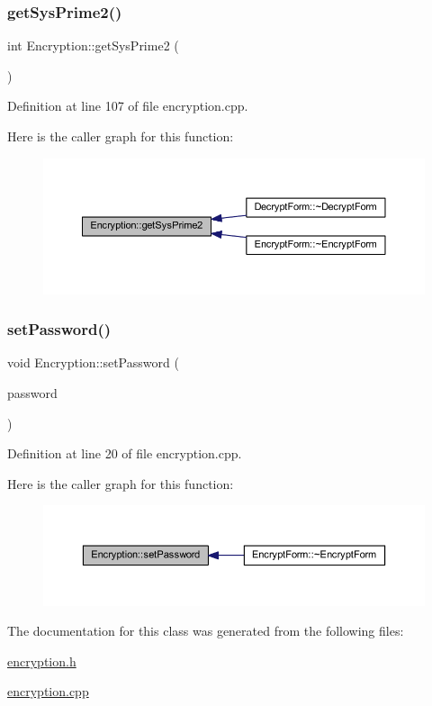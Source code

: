 \subsubsection{\texorpdfstring{get\+Sys\+Prime2()}{getSysPrime2()}}
{\footnotesize\ttfamily int Encryption\+::get\+Sys\+Prime2 (\begin{DoxyParamCaption}{ }\end{DoxyParamCaption})}



Definition at line 107 of file encryption.\+cpp.

Here is the caller graph for this function\+:\nopagebreak
\begin{figure}[H]
\begin{center}
\leavevmode
\includegraphics[width=350pt]{class_encryption_a4a18c3b332487ec393c3ddf06c39c48f_icgraph}
\end{center}
\end{figure}
\hypertarget{class_encryption_a8ddf113b231bf2f60d5714cdf0d07857}{}\label{class_encryption_a8ddf113b231bf2f60d5714cdf0d07857} 
\subsubsection{\texorpdfstring{set\+Password()}{setPassword()}}
{\footnotesize\ttfamily void Encryption\+::set\+Password (\begin{DoxyParamCaption}\item[{Q\+String}]{password }\end{DoxyParamCaption})}



Definition at line 20 of file encryption.\+cpp.

Here is the caller graph for this function\+:\nopagebreak
\begin{figure}[H]
\begin{center}
\leavevmode
\includegraphics[width=350pt]{class_encryption_a8ddf113b231bf2f60d5714cdf0d07857_icgraph}
\end{center}
\end{figure}


The documentation for this class was generated from the following files\+:\begin{DoxyCompactItemize}
\item 
\hyperlink{encryption_8h}{encryption.\+h}\item 
\hyperlink{encryption_8cpp}{encryption.\+cpp}\end{DoxyCompactItemize}

